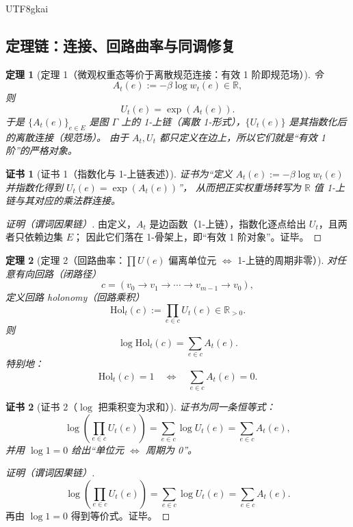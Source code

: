 \documentclass[12pt]{article}
\newtheorem{theorem}{定理}[section]
\newtheorem{Certificate}{证书}[section]
\newcommand{\RR}{\mathbb{R}}
\begin{document}
\begin{CJK*}{UTF8}{gkai}
\subsection{定理链：连接、回路曲率与同调修复}
\label{subsec:tex27-ch5-theorems}

\begin{theorem}[定理 1（微观权重态等价于离散规范连接：有效 1 阶即规范场）]
\label{thm:tex27-ch5-thm1}
令
\[
  A_t(e):=-\beta\log w_t(e)\in\RR,
\]
则
\[
  U_t(e)=\exp(A_t(e)).
\]
于是 $\{A_t(e)\}_{e\in E}$ 是图 $\Gamma$ 上的 1-上链（离散 1-形式），$\{U_t(e)\}$ 是其指数化后的离散连接（规范场）。
由于 $A_t,U_t$ 都只定义在边上，所以它们就是“有效 1 阶”的严格对象。
\end{theorem}

\begin{Certificate}[证书 1（指数化与 1-上链表述）]
\label{cert:tex27-ch5-thm1}
证书为“定义 $A_t(e):=-\beta\log w_t(e)$ 并指数化得到 $U_t(e)=\exp(A_t(e))$”，
从而把正实权重场转写为 $\RR$ 值 1-上链与其对应的乘法群连接。
\end{Certificate}

\begin{proof}[证明（谓词因果链）]
由定义，$A_t$ 是边函数（1-上链），指数化逐点给出 $U_t$，且两者只依赖边集 $E$；
因此它们落在 1-骨架上，即“有效 1 阶对象”。证毕。
\end{proof}

\begin{theorem}[定理 2（回路曲率：$\prod U(e)$ 偏离单位元 $\Leftrightarrow$ 1-上链的周期非零）]
\label{thm:tex27-ch5-thm2}
对任意有向回路（闭路径）
\[
  c=(v_0\to v_1\to\cdots\to v_{m-1}\to v_0),
\]
定义回路 holonomy（回路乘积）
\[
  \mathrm{Hol}_t(c):=\prod_{e\in c}U_t(e)\in\RR_{>0}.
\]
则
\[
  \log \mathrm{Hol}_t(c)=\sum_{e\in c}A_t(e).
\]
特别地：
\[
  \mathrm{Hol}_t(c)=1\quad \Longleftrightarrow\quad \sum_{e\in c}A_t(e)=0.
\]
\end{theorem}

\begin{Certificate}[证书 2（$\log$ 把乘积变为求和）]
\label{cert:tex27-ch5-thm2}
证书为同一条恒等式：
\[
  \log\!\left(\prod_{e\in c}U_t(e)\right)=\sum_{e\in c}\log U_t(e)=\sum_{e\in c}A_t(e),
\]
并用 $\log 1=0$ 给出“单位元 $\Leftrightarrow$ 周期为 0”。
\end{Certificate}

\begin{proof}[证明（谓词因果链）]
\[
  \log\!\left(\prod_{e\in c}U_t(e)\right)
  =\sum_{e\in c}\log U_t(e)
  =\sum_{e\in c}A_t(e).
\]
再由 $\log 1=0$ 得到等价式。证毕。
\end{proof}


\end{CJK*}
\end{document}

